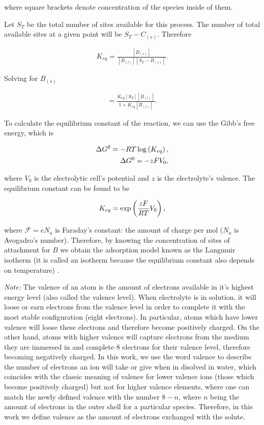 where square brackets denote concentration of the species inside of them.

Let $S_T$ be the total number of sites available for this process. The number of total available sites at a given point will be $S_T -C_{(s)}$. Therefore

\begin{align}
	K_{eq} = \frac{[B_{(s)}]}{[B_{(l)}][S_T -B_{(s)}]}.
\end{align}

Solving for $B_{(s)}$

\begin{align}
	[B_{(s)}] = \frac{K_{eq}[S_T][B_{(l)}]}{1+K_{eq}[B_{(l)}]}.
\end{align} 

To calculate the equilibrium constant of the reaction, we can use the Gibb's free energy, which is

\begin{align}
	\Delta G^0 = -RT \log\left({K_{eq}}\right), \\
	\Delta G^0 = -zF V_0,
\end{align}

where $V_0$ is the electrolytic cell's potential and $z$ is the electrolyte's valence. The equilibrium constant can be found to be

\begin{align}
	K_{eq} = \exp\left({\frac{zF}{RT}V_0}\right),
\end{align}

where $\mathcal{F} = e N_a$ is Faraday's constant: the amount of charge per mol ($N_a$ is Avogadro's number). Therefore, by knowing the concentration of sites of attachment for $B$ we obtain the adsorption model known as the Langmuir isotherm (it is called an isotherm because the equilibrium constant also depends on temperature) \cite{langmuir}.
\newline

\textit{Note:} The valence of an atom is the amount of electrons available in it's highest energy level (also called the valence level). When electrolyte is in solution, it will loose or earn electrons from the valence level in order to complete it with the most stable configuration (eight electrons). In particular, atoms which have lower valence will loose these electrons and therefore become positively charged. On the other hand, atoms with higher valence will capture electrons from the medium they are immersed in and complete 8 electrons for their valence level, therefore becoming negatively charged. In this work, we use the word valence to describe the number of electrons an ion will take or give when in disolved in water, which coincides with the classic meaning of valence for lower valence ions (those which become positively charged) but not for higher valence elements, where one can match the newly defined valence with the number $8-n$, where $n$ being the amount of electrons in the outer shell for a particular species. Therefore, in this work we define valence as the amount of electrons exchanged with the solute.


